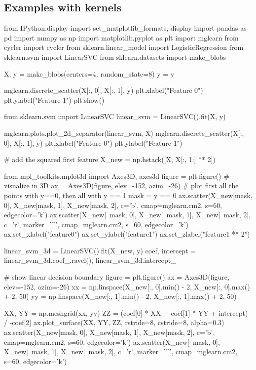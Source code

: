 \documentclass[%
oneside,                 %
final,                   %
10pt]{article}
\begin{document}
\subsection{Examples with kernels}

\bpycod
from IPython.display import set_matplotlib_formats, display
import pandas as pd
import numpy as np
import matplotlib.pyplot as plt
import mglearn
from cycler import cycler
from sklearn.linear_model import LogisticRegression
from sklearn.svm import LinearSVC
from sklearn.datasets import make_blobs


X, y = make_blobs(centers=4, random_state=8)
y = y %

mglearn.discrete_scatter(X[:, 0], X[:, 1], y)
plt.xlabel("Feature 0")
plt.ylabel("Feature 1")
plt.show()

from sklearn.svm import LinearSVC
linear_svm = LinearSVC().fit(X, y)

mglearn.plots.plot_2d_separator(linear_svm, X)
mglearn.discrete_scatter(X[:, 0], X[:, 1], y)
plt.xlabel("Feature 0")
plt.ylabel("Feature 1")
\epycod

\bpycod
# add the squared first feature
X_new = np.hstack([X, X[:, 1:] ** 2])


from mpl_toolkits.mplot3d import Axes3D, axes3d
figure = plt.figure()
# visualize in 3D
ax = Axes3D(figure, elev=-152, azim=-26)
# plot first all the points with y==0, then all with y == 1
mask = y == 0
ax.scatter(X_new[mask, 0], X_new[mask, 1], X_new[mask, 2], c='b',
           cmap=mglearn.cm2, s=60, edgecolor='k')
ax.scatter(X_new[~mask, 0], X_new[~mask, 1], X_new[~mask, 2], c='r', marker='^',
           cmap=mglearn.cm2, s=60, edgecolor='k')
ax.set_xlabel("feature0")
ax.set_ylabel("feature1")
ax.set_zlabel("feature1 ** 2")
\epycod

\bpycod
linear_svm_3d = LinearSVC().fit(X_new, y)
coef, intercept = linear_svm_3d.coef_.ravel(), linear_svm_3d.intercept_

# show linear decision boundary
figure = plt.figure()
ax = Axes3D(figure, elev=-152, azim=-26)
xx = np.linspace(X_new[:, 0].min() - 2, X_new[:, 0].max() + 2, 50)
yy = np.linspace(X_new[:, 1].min() - 2, X_new[:, 1].max() + 2, 50)

XX, YY = np.meshgrid(xx, yy)
ZZ = (coef[0] * XX + coef[1] * YY + intercept) / -coef[2]
ax.plot_surface(XX, YY, ZZ, rstride=8, cstride=8, alpha=0.3)
ax.scatter(X_new[mask, 0], X_new[mask, 1], X_new[mask, 2], c='b',
           cmap=mglearn.cm2, s=60, edgecolor='k')
ax.scatter(X_new[~mask, 0], X_new[~mask, 1], X_new[~mask, 2], c='r', marker='^',
           cmap=mglearn.cm2, s=60, edgecolor='k')
\end{document}
